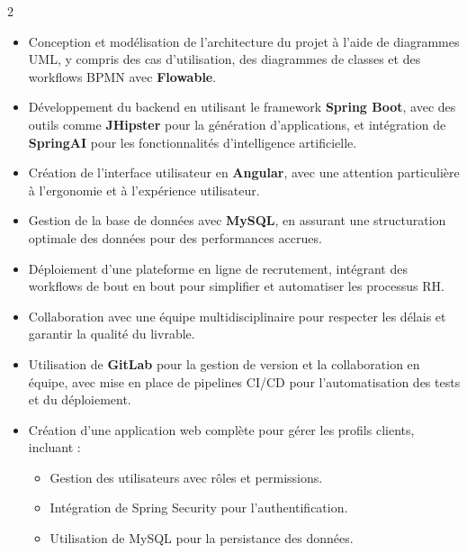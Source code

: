 \documentclass[10pt,a4paper,ragged2e,withhyper]{altacv}
\begin{document}
\begin{paracol}{2}
\divider

\begin{itemize}
\item Conception et modélisation de l'architecture du projet à l'aide de diagrammes UML, y compris des cas d'utilisation, des diagrammes de classes et des workflows BPMN avec \textbf{Flowable}.  
\item Développement du backend en utilisant le framework \textbf{Spring Boot}, avec des outils comme \textbf{JHipster} pour la génération d'applications, et intégration de \textbf{SpringAI} pour les fonctionnalités d'intelligence artificielle.  
\item Création de l'interface utilisateur en \textbf{Angular}, avec une attention particulière à l'ergonomie et à l'expérience utilisateur.  
\item Gestion de la base de données avec \textbf{MySQL}, en assurant une structuration optimale des données pour des performances accrues.  
\item Déploiement d'une plateforme en ligne de recrutement, intégrant des workflows de bout en bout pour simplifier et automatiser les processus RH.  
\item Collaboration avec une équipe multidisciplinaire pour respecter les délais et garantir la qualité du livrable.
\item Utilisation de \textbf{GitLab} pour la gestion de version et la collaboration en équipe, avec mise en place de pipelines CI/CD pour l'automatisation des tests et du déploiement.
\end{itemize}
     

\divider




\begin{itemize}
\item Création d'une application web complète pour gérer les profils clients, incluant :
  \begin{itemize}
    \item Gestion des utilisateurs avec rôles et permissions.
    \item Intégration de Spring Security pour l'authentification.
    \item Utilisation de MySQL pour la persistance des données.
  \end{itemize}
\end{itemize}


\end{paracol}
\end{document}
